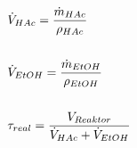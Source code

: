\documentclass[12pt,liststotoc]{report}
\begin{document}
\begin{align}
    &\dot{V}_{HAc} = \frac{\dot{m}_{HAc}}{\rho_{HAc}}\\
    \notag\\
    &\dot{V}_{EtOH} = \frac{\dot{m}_{EtOH}}{\rho_{EtOH}}\\
    \notag\\
    &\tau_{real} = \frac{V_{Reaktor}}{\dot{V}_{HAc} + \dot{V}_{EtOH}}
\end{align}



%
%
\end{document}
